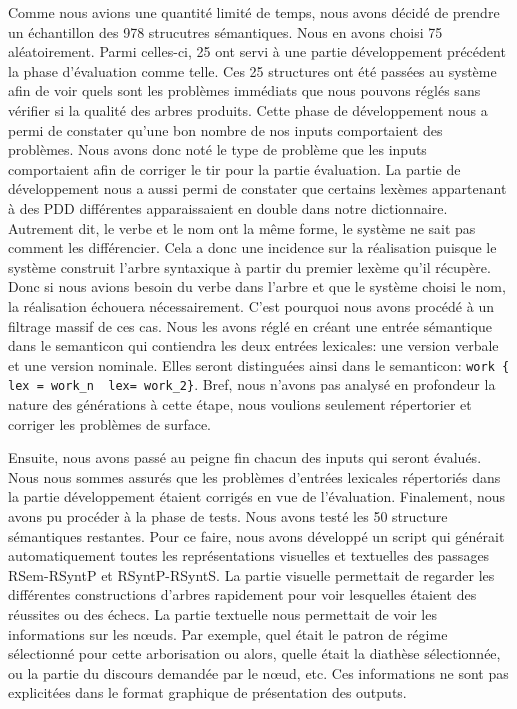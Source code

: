 Comme nous avions une quantité limité de temps, nous avons décidé de prendre un échantillon des 978 strucutres sémantiques. Nous en avons choisi 75 aléatoirement. Parmi celles-ci, 25 ont servi à une partie développement précédent la phase d'évaluation comme telle. Ces 25 structures ont été passées au système afin de voir quels sont les problèmes immédiats que nous pouvons réglés sans vérifier si la qualité des arbres produits. Cette phase de développement nous a permi de constater qu'une bon nombre de nos inputs comportaient des problèmes. Nous avons donc noté le type de problème que les inputs comportaient afin de corriger le tir pour la partie évaluation. La partie de développement nous a aussi permi de constater que certains lexèmes appartenant à des PDD différentes apparaissaient en double dans notre dictionnaire. Autrement dit, le verbe  et le nom  ont la même forme, le système ne sait pas comment les différencier. Cela a donc une incidence sur la réalisation puisque le système construit l'arbre syntaxique à partir du premier lexème qu'il récupère. Donc si nous avions besoin du verbe dans l'arbre et que le système choisi le nom, la réalisation échouera nécessairement. C'est pourquoi nous avons procédé à un filtrage massif de ces cas. Nous les avons réglé en créant une entrée sémantique dans le semanticon qui contiendra les deux entrées lexicales: une version verbale et une version nominale. Elles seront distinguées ainsi dans le semanticon: \lstinline!work { lex = work_n  lex= work_2}!. Bref, nous n'avons pas analysé en profondeur la nature des générations à cette étape, nous voulions seulement répertorier et corriger les problèmes de surface.

Ensuite, nous avons passé au peigne fin chacun des inputs qui seront évalués. Nous nous sommes assurés que les problèmes d'entrées lexicales répertoriés dans la partie développement étaient corrigés en vue de l'évaluation. Finalement, nous avons pu procéder à la phase de tests. Nous avons testé les 50 structure sémantiques restantes. Pour ce faire, nous avons développé un script qui générait automatiquement toutes les représentations visuelles et textuelles des passages RSem-RSyntP et RSyntP-RSyntS. La partie visuelle permettait de regarder les différentes constructions d'arbres rapidement pour voir lesquelles étaient des réussites ou des échecs. La partie textuelle nous permettait de voir les informations sur les n\oe{}uds. Par exemple, quel était le patron de régime sélectionné pour cette arborisation ou alors, quelle était la diathèse sélectionnée, ou la partie du discours demandée par le n\oe{}ud, etc. Ces informations ne sont pas explicitées dans le format graphique de présentation des outputs. 
                              
